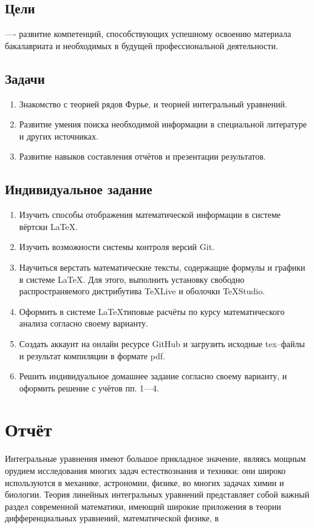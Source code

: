 \documentclass[12pt]{article}
\begin{document}
\subsection{Цели} 
—- развитие компетенций, способствующих успешному освоению материала бакалавриата и необходимых в будущей профессиональной деятельности. 

\subsection{Задачи} 
\begin{enumerate} 
\item Знакомство с теорией рядов Фурье, и теорией интегральный уравнений. 
\item Развитие умения поиска необходимой информации в специальной литературе и других источниках. 
\item Развитие навыков составления отчётов и презентации результатов. 
\end{enumerate} 

\subsection{Индивидуальное задание} 
\begin{enumerate} 
\item Изучить способы отображения математической информации в системе вёртски \LaTeX. 
\item Изучить возможности системы контроля версий \textsf{Git}. 
\item Научиться верстать математические тексты, содержащие формулы и графики в системе \LaTeX. 
Для этого, выполнить установку свободно распространяемого дистрибутива \textsf{TeXLive} и оболочки \textsf{TeXStudio}. 
\item Оформить в системе \LaTeX типовые расчёты по курсу математического анализа согласно своему варианту. 
\item Создать аккаунт на онлайн ресурсе \textsf{GitHub} и загрузить исходные \textsf{tex}--файлы 
и результат компиляции в формате \textsf{pdf}. 
\item Решить индивидуальное домашнее задание согласно своему варианту, и оформить решение с учётов пп. 1---4. 
\end{enumerate} 

\newpage 
\section{Отчёт} 
Интегральные уравнения имеют большое прикладное значение, являясь мощным 
орудием исследования многих задач естествознания и техники: они широко используются 
в механике, астрономии, физике, во многих задачах химии и биологии. Теория линейных 
интегральных уравнений представляет собой важный раздел современной математики, 
имеющий широкие приложения в теории дифференциальных уравнений, математической 
физике, в
 
\end{document}
